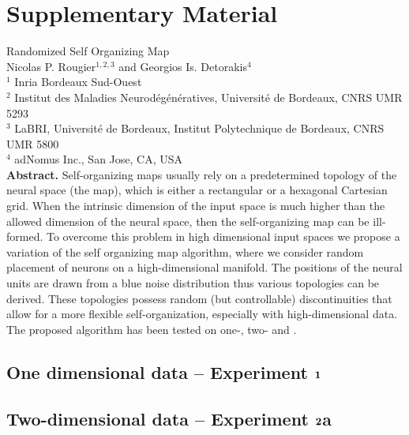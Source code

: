
\section{Supplementary Material}

Randomized Self Organizing Map \\ 
Nicolas P. Rougier$^{1,2,3}$ and Georgios Is. Detorakis$^4$ \\
$^1$ Inria Bordeaux Sud-Ouest \\
$^2$ Institut des Maladies Neurodégénératives, Université  de Bordeaux, CNRS UMR 5293 \\
$^3$ LaBRI, Université de Bordeaux, Institut Polytechnique de Bordeaux, CNRS UMR 5800 \\
$^4$ adNomus Inc., San Jose, CA, USA \\


\noindent\textbf{Abstract.} Self-organizing maps usually rely on a predetermined topology
of the neural space (the map), which is either a rectangular or a hexagonal Cartesian grid.
When the intrinsic dimension of  the input space is much higher than the allowed dimension
of the neural space, then the self-organizing map can be ill-formed. To overcome this problem
in  high dimensional input spaces we propose a variation of the self organizing map algorithm,
where we consider random placement of neurons on a high-dimensional manifold. The positions of
the neural units are drawn from a blue noise  distribution thus various topologies can be
derived. These topologies possess  random (but controllable) discontinuities that allow for a
more flexible self-organization, especially with high-dimensional data. The proposed algorithm
has been tested on one-, two- and . \par

\renewcommand\thefigure{S\arabic{figure}} 
\setcounter{figure}{0} 



\subsection{One dimensional data -- Experiment ${\bf 1}$}



\subsection{Two-dimensional data -- Experiment ${\bf 2}$a}



